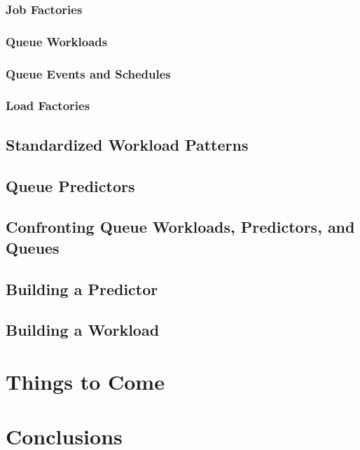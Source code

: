 \documentclass[12pt]{book}
\begin{document}
\subsection{Job Factories}

\subsection{Queue Workloads}

\subsection{Queue Events and Schedules}

\subsection{Load Factories}

\section{Standardized Workload Patterns}

\section{Queue Predictors}

\section{Confronting Queue Workloads, Predictors, and Queues}

\section{Building a Predictor}

\section{Building a Workload}

\chapter{Things to Come}

\chapter{Conclusions}
\end{document}
